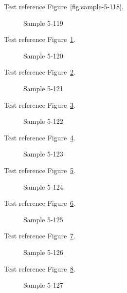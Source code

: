 Test reference Figure~\ref{fig:sample-5-118}.

\begin{figure}[tbhp]
\caption{Sample 5-119}
\label{fig:sample-5-119}
\end{figure}

Test reference Figure~\ref{fig:sample-5-119}.

\begin{figure}[tbhp]
\caption{Sample 5-120}
\label{fig:sample-5-120}
\end{figure}

Test reference Figure~\ref{fig:sample-5-120}.

\begin{figure}[tbhp]
\caption{Sample 5-121}
\label{fig:sample-5-121}
\end{figure}

Test reference Figure~\ref{fig:sample-5-121}.

\begin{figure}[tbhp]
\caption{Sample 5-122}
\label{fig:sample-5-122}
\end{figure}

Test reference Figure~\ref{fig:sample-5-122}.

\begin{figure}[tbhp]
\caption{Sample 5-123}
\label{fig:sample-5-123}
\end{figure}

Test reference Figure~\ref{fig:sample-5-123}.

\begin{figure}[tbhp]
\caption{Sample 5-124}
\label{fig:sample-5-124}
\end{figure}

Test reference Figure~\ref{fig:sample-5-124}.

\begin{figure}[tbhp]
\caption{Sample 5-125}
\label{fig:sample-5-125}
\end{figure}

Test reference Figure~\ref{fig:sample-5-125}.

\begin{figure}[tbhp]
\caption{Sample 5-126}
\label{fig:sample-5-126}
\end{figure}

Test reference Figure~\ref{fig:sample-5-126}.

\begin{figure}[tbhp]
\caption{Sample 5-127}
\label{fig:sample-5-127}
\end{figure}

